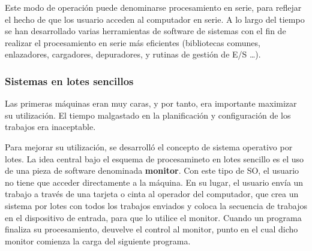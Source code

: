 \documentclass{article}
\begin{document}
					Este modo de operación puede denominarse procesamiento en serie, para reflejar el hecho de que los usuario acceden al computador en serie. A lo largo del tiempo se han desarrollado varias herramientas de software de sistemas con el fin de realizar el procesamiento en serie más eficientes (bibliotecas comunes, enlazadores, cargadores, depuradores, y rutinas de gestión de E/S \ldots).
					
				\subsubsection{Sistemas en lotes sencillos}
					Las primeras máquinas eran muy caras, y por tanto, era importante maximizar su utilización. El tiempo malgastado en la planificación y configuración de los trabajos era inaceptable. 
					
					Para mejorar su utilización, se desarrolló el concepto de sistema operativo por lotes. La idea central bajo el esquema de procesamineto en lotes sencillo es el uso de una pieza de software denominada \textbf{monitor}. Con este tipo de SO, el usuario no tiene que acceder directamente a la máquina. En su lugar, el usuario envía un trabajo a través de una tarjeta o cinta al operador del computador, que crea un sistema por lotes con todos los trabajos enviados y coloca la secuencia de trabajos en el dispositivo de entrada, para que lo utilice el monitor. Cuando un programa finaliza su procesamiento, deuvelve el control al monitor, punto en el cual dicho monitor comienza la carga del siguiente programa.
					
\end{document}
